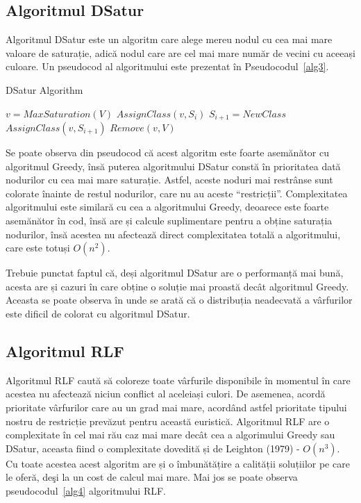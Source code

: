 \documentclass[runningheads]{llncs}
\begin{document}
\subsection{Algoritmul DSatur}
Algoritmul DSatur este un algoritm care alege mereu nodul cu cea mai mare
valoare de saturație, adică nodul care are cel mai mare număr de vecini cu
aceeași culoare. Un pseudocod al algoritmului este prezentat în Pseudocodul~\ref{alg3}.
\begin{algorithm}
\caption{DSatur Algorithm}
\label{alg3}
\begin{algorithmic}[1]
\State $v = MaxSaturation(V)$
\State $AssignClass(v, S_i)$
\EndIf
{}
\State $S_{i+1} = NewClass$
\State $AssignClass(v, S_{i+1})$
\State $Remove(v, V)$
\EndIf
\EndFor
\EndWhile
\EndProcedure
\end{algorithmic}
\end{algorithm}

Se poate observa din pseudocod că acest algoritm este foarte asemănător cu algoritmul
Greedy, însă puterea algoritmului DSatur constă în prioritatea dată nodurilor cu cea mai
mare saturație. Astfel, aceste noduri mai restrânse sunt colorate înainte de restul nodurilor,
care nu au aceste “restricții”. Complexitatea algoritmului este similară cu cea a algoritmului
Greedy, deoarece este foarte asemănător în cod, însă are și calcule suplimentare pentru a
obține saturația nodurilor, însă acestea nu afectează direct complexitatea totală a algoritmului,
care este totuși $O(n^2)$. 

Trebuie punctat faptul că, deși algoritmul DSatur are o performanță mai bună,
acesta are și cazuri în care obține o soluție
mai proastă decât algoritmul Greedy. Aceasta se poate observa în \cite{15} unde se arată că o
distribuția neadecvată a vârfurilor este dificil de colorat cu algoritmul DSatur.

\subsection{Algoritmul RLF}
Algoritmul RLF caută să coloreze toate vârfurile disponibile în momentul în care
acestea nu afectează niciun conflict al aceleiași culori. De asemenea, acordă
prioritate vârfurilor care au un grad mai mare, acordând astfel prioritate tipului
nostru de restricție prevăzut pentru această euristică. Algoritmul RLF are
o complexitate în cel mai rău caz mai mare decât cea a algorimului Greedy sau
DSatur, aceasta fiind o complexitate dovedită și de Leighton (1979) - $O(n^3)$.
Cu toate acestea acest algoritm are și o îmbunătățire a calității soluțiilor pe
care le oferă, deşi la un cost de calcul mai mare. Mai jos se poate observa pseudocodul~\ref{alg4} algoritmului RLF.
\end{document}
